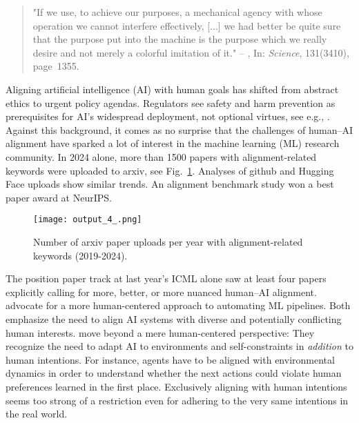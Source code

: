 \documentclass{article}
\theoremstyle{plain}
\theoremstyle{definition}
\theoremstyle{remark}
\begin{document}
\begin{small}
    \begin{quote}
         "If we use, to achieve our purposes, a mechanical agency with whose operation we cannot interfere effectively, [...] we had better be quite sure that the purpose put into the machine is the purpose which we really desire and not merely a colorful imitation of it." \flushright -- \citet{wiener1960automation}, In: \textit{Science}, 131(3410), page~1355.
    \end{quote}
\end{small}
Aligning artificial intelligence (AI) with human goals has shifted from abstract ethics to urgent policy agendas. Regulators see safety and harm prevention as prerequisites for AI's widespread deployment, not optional virtues, see e.g., \citet{chatila2019ieee}.
%
%
Against this background, it comes as no surprise that the challenges of human--AI alignment have sparked a lot of interest in the machine learning (ML) research community. 
In 2024 alone, more than 1500 papers with alignment-related keywords were uploaded to arxiv, see Fig.~\ref{fig:arxiv-trends}. Analyses of github and Hugging Face uploads show similar trends. An alignment benchmark study \cite{kirk2024prism} won a best paper award at NeurIPS. 
%
\begin{figure}
    \centering
    \texttt{[image: output\_4\_.png]}
    \caption{Number of arxiv paper uploads per year with alignment-related keywords (2019-2024). 
    }
    \label{fig:arxiv-trends}
\end{figure}

The position paper track at last year's ICML alone saw at least four papers \cite{sorensenposition,lindauer2024position,conitzerposition,yangposition} explicitly calling for more, better, or more nuanced human--AI alignment. \citet{lindauer2024position} advocate for a more human-centered approach to automating ML pipelines. Both \citet{sorensenposition,conitzerposition} emphasize the need to align AI systems with diverse and potentially conflicting human interests. 
%
\citet{yangposition} move beyond a mere human-centered perspective: They recognize the need to adapt AI to environments and self-constraints in \textit{addition} to human intentions. %
For instance, agents have to be aligned with environmental dynamics in order to understand whether the next actions could violate human preferences learned in the first place. Exclusively aligning with human intentions seems too strong of a restriction even for adhering to the very same intentions in the real world.    
%
%
%
\end{document}
